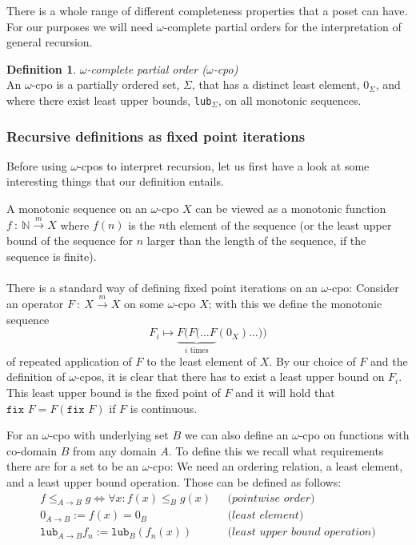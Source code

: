 \documentclass[11pt, leqno, titlepage]{article}
\theoremstyle{definition}
\newtheorem{defn}[thm]{Definition}
\begin{document}
There is a whole range of different completeness properties that a poset can have.
For our purposes we will need $\omega$-complete partial orders for the interpretation
of general recursion.  

\begin{defn}
  \textit{$\omega$-complete partial order ($\omega$-cpo)}\\
  An $\omega$-cpo is a partially ordered set, $\Sigma$, that has a distinct least
  element, $0_\Sigma$, and where there exist least upper bounds, \texttt{lub}$_\Sigma$,
  on all monotonic sequences.
\end{defn}

\subsubsection{Recursive definitions as fixed point iterations}
\label{sec:fixp-iter}

Before using $\omega$-cpos to interpret recursion, let us first have a look at some
interesting things that our definition entails.

A monotonic sequence on an $\omega$-cpo $X$ can be viewed as a monotonic function
$f~:~\mathbb{N} \xrightarrow{m} X$ where $f(n)$ is the $n$th element of the sequence
(or the least upper bound of the sequence for $n$ larger than the length of the
sequence, if the sequence is finite).\\
\\
There is a standard way of defining fixed point iterations on an
$\omega$-cpo\cite{rml-paper}: Consider an operator $F~:~X \xrightarrow{m} X$ on some
$\omega$-cpo $X$; with this we define the monotonic sequence
$$F_i \mapsto \underbrace{ F(F(\dots F}_{i \text{ times}} (0_X) \dots))$$
of repeated application of $F$ to the least element of $X$.  By our choice of $F$ and
the definition of $\omega$-cpos, it is clear that there has to exist a least upper
bound on $F_i$. This least upper bound is the fixed point of $F$ and it will hold
that $\texttt{fix } F = F(\texttt{fix }F)$ if $F$ is continuous.

For an $\omega$-cpo with underlying set $B$ we can also define an $\omega$-cpo on
functions with co-domain $B$ from any domain $A$.  To define this we recall what
requirements there are for a set to be an $\omega$-cpo: We need an ordering relation,
a least element, and a least upper bound operation. Those can be defined as follows:
\begin{align*}
  f\leq_{A \to B} g \Leftrightarrow \forall x: f(x) \leq_B g(x) & ~~~\textit{(pointwise order)}\\
  0_{A\to B} := f(x) = 0_B & ~~~\textit{(least element)}\\
  \texttt{lub}_{A\to B} f_n := \texttt{lub}_B(f_n(x)) & ~~~\textit{(least upper
                                                               bound operation)}
\end{align*}
\end{document}
